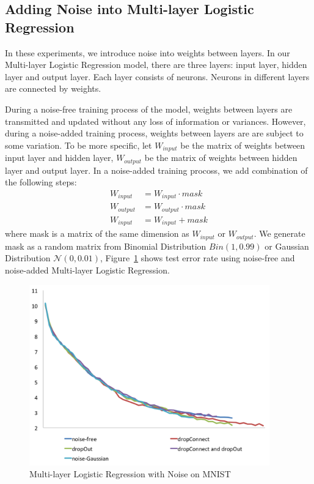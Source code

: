 \subsection{Adding Noise into Multi-layer Logistic Regression}
In these experiments, we introduce noise into weights between layers.
In our Multi-layer Logistic Regression model, there are three layers:
input layer, hidden layer and output layer. Each layer consists of
neurons. Neurons in different layers are connected by weights.

During a noise-free training process of the model, weights between layers
are transmitted and updated without any loss of information or variances.
However, during a noise-added training process, weights between layers are
are subject to some variation.
To be more specific, let $W_{input}$ be the matrix of weights between
input layer and hidden layer, $W_{output}$ be the matrix of weights
between hidden layer and output layer. In a noise-added training procoss,
we add combination of the following steps:
\begin{align*}
W_{input} & = W_{input} \cdot mask \\
W_{output} & = W_{output} \cdot mask \\
W_{input} & = W_{input} + mask
\end{align*}
where mask is a matrix of the same dimension as $W_{input}$ or $W_{output}$.
We generate mask as a random matrix from Binomial Distribution
$Bin(1,0.99)$ or Gaussian Distribution $\mathcal{N}(0, 0.01)$,
Figure~\ref{mlp} shows test error rate using noise-free and noise-added
Multi-layer Logistic Regression.
\begin{figure}[!htbp]
\centering
\label{mlp}
\caption{Multi-layer Logistic Regression with Noise on MNIST}
\includegraphics[width=295pt]{f-figs/mlp.png}
\end{figure}

